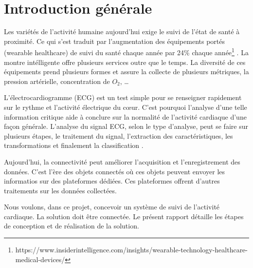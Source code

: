 \chapter*{Introduction générale}
Les variétés de l'activité humaine aujourd'hui exige le suivi de l'état de santé à proximité. Ce qui s'est traduit par l'augmentation des équipements portés (wearable healthcare) de suivi du santé chaque année par 24\% chaque année\footnote{https://www.insiderintelligence.com/insights/wearable-technology-healthcare-medical-devices/} \cite{3}. La montre intélligente offre plusieurs services outre que le temps. La diversité de ces équipements prend plusieurs formes et assure la collecte de plusieurs métriques, la pression artérielle, concentration de $O_2$, \ldots

L'électrocardiogramme (ECG) est un test simple pour se renseigner rapidement sur le rythme et l'activité électrique du c\oe ur. C'est pourquoi l'analyse d'une telle information critique aide à conclure sur la normalité de l'activité cardiaque d'une façon générale. L'analyse du signal ECG, selon le type d'analyse, peut se faire sur plusieurs étapes, le traitement du signal, l'extraction des caractéristiques, les transformations et finalement la classification \cite{1, 2}.

Aujourd'hui, la connectivité peut améliorer l'acquisition et l'enregistrement des données. C'est l'ère des objets connectés où ces objets peuvent envoyer les informatios sur des plateformes dédiées. Ces plateformes offrent d'autres traitements sur les données collectées.

Nous voulons, dans ce projet, concevoir un système de suivi de l'activité cardiaque. La solution doit être connectée. Le présent rapport détaille les étapes de conception et de réalisation de la solution.